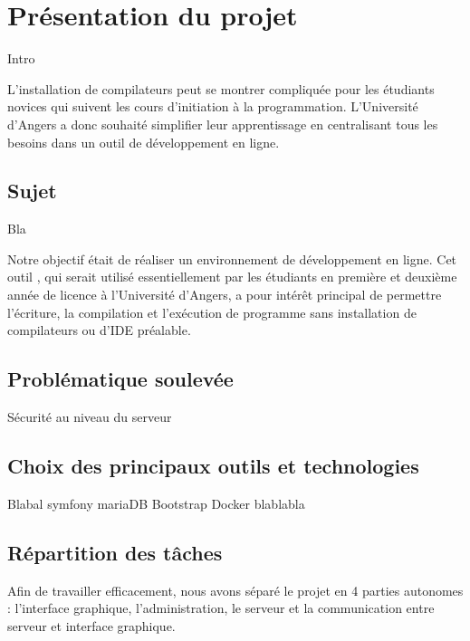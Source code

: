 \chapter{Présentation du projet}

Intro\footnotemark\\

\par L'installation de compilateurs peut se montrer compliquée pour les étudiants novices qui suivent les cours d'initiation à la programmation. L'Université d'Angers a donc souhaité simplifier leur apprentissage en centralisant tous les besoins dans un outil de développement en ligne.

\section{Sujet}
Bla\\

\par Notre objectif était de réaliser un environnement de développement en ligne. Cet outil , qui serait utilisé essentiellement par les étudiants en première et deuxième année de licence à l'Université d'Angers, a pour intérêt principal de permettre l’écriture, la compilation et l’exécution de programme sans installation de compilateurs ou d'IDE préalable.

\section{Problématique soulevée}

Sécurité au niveau du serveur

\section{Choix des principaux outils et technologies}

Blabal symfony mariaDB Bootstrap Docker blablabla

\section{Répartition des tâches}

\par Afin de travailler efficacement, nous avons séparé le projet en 4 parties autonomes : l'interface graphique, l'administration, le serveur et la communication entre serveur et interface graphique.